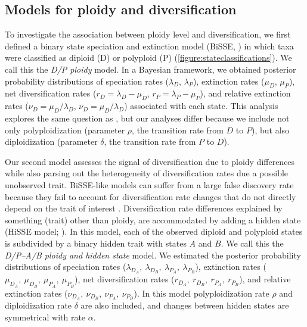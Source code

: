
\subsection{Models for ploidy and diversification}

To investigate the association between ploidy level and diversification, we first defined a binary state speciation and extinction model (BiSSE, \citealt{maddison_2007}) in which taxa were classified as diploid (D) or polyploid (P) (\cref{figure:stateclassifications}).
We call this the \textit{D/P ploidy} model. %
In a Bayesian framework, we obtained posterior probability distributions of speciation rates ($\lambda_D$, $\lambda_P$), extinction rates ($\mu_D$, $\mu_P$), net diversification rates ($r_D=\lambda_D-\mu_D$, $r_P=\lambda_P-\mu_P$), and relative extinction rates ($\nu_D=\mu_D / \lambda_D$, $\nu_D=\mu_D / \lambda_D$) associated with each state.
This analysis explores the same question as \citet{mayrose_2011, mayrose_2015}, but our analyses differ because we include not only polyploidization (parameter $\rho$, the transition rate from $D$ to $P$), but also diploidization (parameter $\delta$, the transition rate from $P$ to $D$). %


Our second model assesses the signal of diversification due to ploidy differences while also parsing out the heterogeneity of diversification rates due a possible unobserved trait.
BiSSE-like models can suffer from a large false discovery rate because they fail to account for diversification rate changes that do not directly depend on the trait of interest \citep{rabosky_2015, beaulieu_2016}.
Diversification rate differences explained by something (trait) other than ploidy, are accommodated by adding a hidden state (HiSSE model; \citealt{beaulieu_2016}). %
In this model, each of the observed diploid and polyploid states is subdivided by a binary hidden trait with states $A$ and $B$.
We call this the \textit{D/P--A/B ploidy and hidden state} model. 
We estimated the posterior probability distributions of speciation rates ($\lambda_{D_A},\ \lambda_{D_B},\ \lambda_{P_A},\ \lambda_{P_B}$), extinction rates ($\mu_{D_A},\ \mu_{D_B},\ \mu_{P_A},\ \mu_{P_B}$), net diversification rates ($r_{D_A},\ r_{D_B},\ r_{P_A},\ r_{P_B}$), and relative extinction rates ($\nu_{D_A},\ \nu_{D_B},\ \nu_{P_A},\ \nu_{P_B}$).
In this model polyploidization rate $\rho$ and diploidization rate $\delta$ are also included, and changes between hidden states are symmetrical with rate $\alpha$. %

